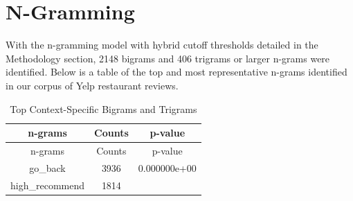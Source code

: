 \documentclass[12pt,twoside]{dukestatscithesis}
\theoremstyle{definition}
\theoremstyle{definition}
\theoremstyle{definition}
\theoremstyle{remark}
\begin{document}
\section{N-Gramming}\label{n-gramming-1}

With the n-gramming model with hybrid cutoff thresholds detailed in the
Methodology section, 2148 bigrams and 406 trigrams or larger n-grams
were identified. Below is a table of the top and most representative
n-grams identified in our corpus of Yelp restaurant reviews.
\begin{longtable}[]{@{}ccc@{}}
\caption{\label{tab:bigram} Top Context-Specific Bigrams and
Trigrams}\tabularnewline
\toprule
\begin{minipage}[b]{0.31\columnwidth}\centering\strut
n-grams\strut
\end{minipage} & \begin{minipage}[b]{0.44\columnwidth}\centering\strut
Counts\strut
\end{minipage} & \begin{minipage}[b]{0.17\columnwidth}\centering\strut
p-value\strut
\end{minipage}\tabularnewline
\midrule
\endfirsthead
\toprule
\begin{minipage}[b]{0.31\columnwidth}\centering\strut
n-grams\strut
\end{minipage} & \begin{minipage}[b]{0.44\columnwidth}\centering\strut
Counts\strut
\end{minipage} & \begin{minipage}[b]{0.17\columnwidth}\centering\strut
p-value\strut
\end{minipage}\tabularnewline
\midrule
\endhead
\begin{minipage}[t]{0.31\columnwidth}\centering\strut
go\_back\strut
\end{minipage} & \begin{minipage}[t]{0.44\columnwidth}\centering\strut
3936\strut
\end{minipage} & \begin{minipage}[t]{0.17\columnwidth}\centering\strut
0.000000e+00\strut
\end{minipage}\tabularnewline
\begin{minipage}[t]{0.31\columnwidth}\centering\strut
high\_recommend\strut
\end{minipage} & \begin{minipage}[t]{0.44\columnwidth}\centering\strut
1814\strut
\end{minipage} & \begin{minipage}[t]{0.17\columnwidth}\centering\strut

\end{minipage}
\end{longtable}
\end{document}
